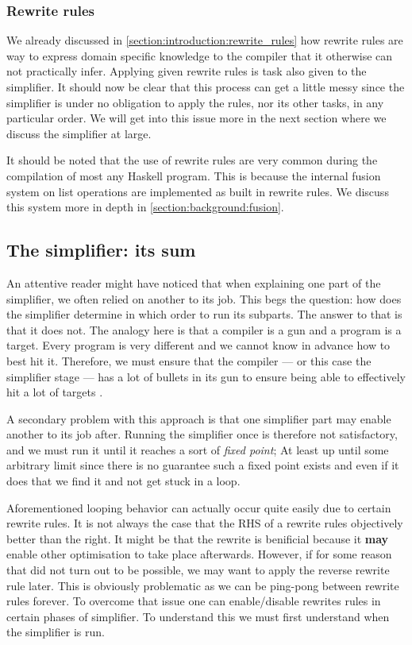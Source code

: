 \subsubsection{Rewrite rules}

We already discussed in \cref{section:introduction:rewrite_rules} how rewrite rules are way to express domain
specific knowledge to the compiler that it otherwise can not practically infer. Applying given rewrite rules is task
also given to the simplifier. It should now be clear that this process can get a little messy since the simplifier
is under no obligation to apply the rules, nor its other tasks, in any particular order. We will get into this issue
more in the next section where we discuss the simplifier at large.

It should be noted that the use of rewrite rules are very common during the compilation of most any Haskell program.
This is because the internal fusion system on list operations are implemented as built in rewrite rules.
We discuss this system more in depth in \cref{section:background:fusion}.



\subsection{The simplifier: its sum}

An attentive reader might have noticed that when explaining one part of the simplifier, we often relied on another to
its job. This begs the question: how does the simplifier determine in which order to run its subparts. The answer to that is
that it does not. The analogy here is that a compiler is a gun and a program is a target. Every program is very different
and we cannot know in advance how to best hit it. Therefore, we must ensure that the compiler --- or this case the simplifier stage ---
has a lot of bullets in its gun to ensure being able to effectively hit a lot of targets \cite{haskell_optimisations_1997}.

A secondary problem with this approach is that one simplifier part may enable another to its job after. Running the simplifier
once is therefore not satisfactory, and we must run it until it reaches a sort of \textit{fixed point}; At least up until some
arbitrary limit since there is no guarantee such a fixed point exists and even if it does that we find it and not get stuck in a loop.

Aforementioned looping behavior can actually occur quite easily due to certain rewrite rules. It is not always the case that
the RHS of a rewrite rules objectively better than the right. It might be that the rewrite is benificial because it \textbf{may}
enable other optimisation to take place afterwards. However, if for some reason that did not turn out to be possible, we may want
to apply the reverse rewrite rule later. This is obviously problematic as we can be ping-pong between rewrite rules forever.
To overcome that issue one can enable/disable rewrites rules in certain phases of simplifier. To understand this we must first
understand when the simplifier is run.


